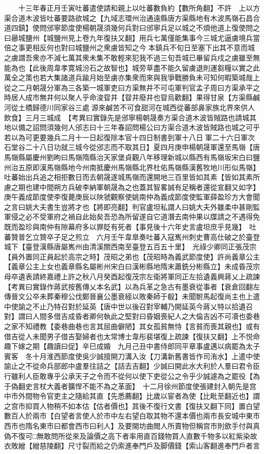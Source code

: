 　　十三年春正月壬寅吐蕃遣使請和親上以吐蕃數負約【數所角翻】不許　上以方渠合道木波皆吐蕃要路欲城之【九域志環州治通遠縣唐方渠縣地有木波馬嶺石昌合道四鎮】使問邠寧節度使楊朝晟須幾何兵對曰邠寧兵足以城之不煩他道上復使問之曰曏城鹽州【城鹽州見上卷九年復扶又翻】用兵七萬僅能集事今三城尤逼虜境兵當倍之事更相反何也對曰城鹽州之衆虜皆知之今本鎮兵不旬日至塞下出其不意而城之虜謂吾衆亦不減七萬其衆未集不敢輕來犯我不過三旬吾城已畢留兵戍之虜雖至無能為也【此後周韋孝寛城汾石之故智也】城旁草盡不能久留虜退則運芻糧以實之此萬全之策也若大集諸道兵踰月始至虜亦集衆而來與我爭戰勝負未可知何暇築城哉上從之二月朝晟分軍為三各築一城軍吏曰方渠無井不可屯軍判官孟子周曰方渠承平之時居人成市無井何以聚人乎命浚眢井【眢井廢井也眢烏歡翻】果得甘泉【方渠縣鹹河從土橋歸德川同家谷三處源來鹹苦不可食甜河在城西從蕃部鼻家族北界來供人飲食】三月三城成　【考異曰實錄先是邠寧楊朝晟奏方渠合道木波皆賊路也請城其地以備之詔問須幾何人邠志曰十三年春詔問楊公曰方渠合道木波皆賊路也城之可乎若以為可更要幾兵二月十一日起復除本官十四日制書到軍十八日軍二十六日軍次石堂谷二十八日功就三城今從邠志而不取其日】夏四月庚申楊朝晟軍還至馬嶺【唐馬嶺縣屬慶州劉昫曰馬嶺隋縣治天家堡貞觀八年移理新城以縣西有馬嶺坂宋白曰鹽州治五原即漢馬嶺縣地今州南抵慶州馬嶺縣北界杜佑馬嶺縣漢舊牧地川形似馬嶺】吐蕃始出兵追之相拒數日而去朝晟遂城馬嶺而還開地三百里皆如其素【皆如其素所慮之期也建中間朔方兵破李納軍朝晟為之也蓋其智畧誠有足稱者還從宣翻又如字】　庚午義成節度使李復薨庚辰以陜虢觀察使姚南仲為義成節度使監軍薛盈珍方大會聞之言曰姚大夫書生豈將才也【將即亮翻】判官盧坦私謂人曰姚大夫外雖柔中甚剛監軍侵之必不受軍府之禍自此始矣吾恐為所留遂自它道潛去南仲果以牒請之不遇得免既而盈珍與南仲有隙幕府多以罪貶有死者【事見後十六年史言盧坦庶乎見幾】　吐蕃贊普乞立贊卒子足之煎立　六月壬午韋臯奏吐蕃入寇嶲州刺史曹高仕破之於臺登城下【臺登漢縣唐屬嶲州由清溪關西南至臺登五百五十里】　光祿少卿同正張茂宗【員外置同正員起於高宗之時】茂昭之弟也【茂昭時為義武節度使】許尚義章公主【義章公主上女也義章縣名屬彬州宋白曰漢彬縣地隋末蕭銑分彬縣立】未成昏茂宗母卒遺表請終嘉禮上許之秋八月癸酉起復茂宗左衛將軍同正左拾遺義興蔣乂上疏諫　【考異曰實錄作蔣武按舊傳乂本名武】以為兵革之急古有墨衰從事者【衰倉回翻左傳晉文公卒未葬秦穆公伐鄭晉襄公墨衰絰以敗秦師于殽】未聞駙馬起復尚主也上遣中使諭之不止乃特召對於延英【唐中世以後召對宰輔乃開延英今蔣乂特以拾遺召對】謂曰人間多借吉成昏者卿何執此之堅對曰昏姻喪紀人之大倫吉凶不可凟也委巷之家不知禮教【委巷曲巷也言其屈曲僻陋】其女孤貧無恃【言貧而喪其親也】或有借吉從人未聞男子借吉娶婦者也太常博士韋彤裴堪復上疏諫【復扶又翻】上不悦命趣下嫁之期【趣讀曰促】辛巳成婚　九月己丑中書侍郎同平章事盧邁以病罷為太子賓客　冬十月淮西節度使吳少誠擅開刀溝入汝【刀溝新舊書皆作司洧水】上遣中使諭止之不從命兵部郎中盧羣往詰之【詰去吉翻】少誠曰開此水大利於人羣曰君令臣行雖利人臣敢專乎公承天子之令而不從何以使下吏從公之令乎少誠遽為之罷役【為于偽翻史言杖大義者獷悍不能不為之革面】　十二月徐州節度使張建封入朝先是宫中市外間物令官吏主之隨給其直【先悉薦翻】比歲以宦者為使【比毗至翻近也】謂之宫市抑買人物稍不如本估【估者價也】其後不復行文書【復扶又翻下同】置白望數百人於兩市【白望者言使人於市中左右望白取其物不還本價也兩市長安城中東市西市也隋名東市曰都會西市曰利人】及要閙坊曲閲人所賣物但稱宫市則歛手付與真偽不復可□無敢問所從來及論價之高下者率用直百錢物買人直數千物多以紅紫染故衣敗繒【繒慈陵翻】尺寸裂而給之仍索進奉門戶及脚價錢【索山客翻進奉門戶者言